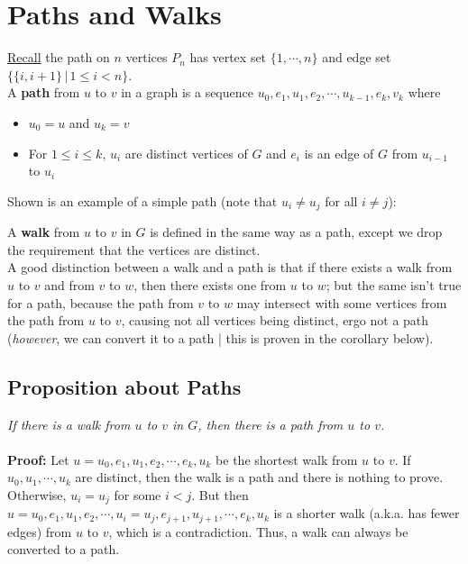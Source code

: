 \documentclass{report}
\begin{document}
\section{Paths and Walks}
\underline{Recall} the path on $n$ vertices $P_n$ has vertex set $\{1, \cdots, n\}$ and edge set $\{\{i, i+1\} \,\vert\, 1 \leq i < n\}$.\\
A \textbf{path} from $u$ to $v$ in a graph is a sequence $u_0, e_1, u_1, e_2, \cdots , u_{k-1}, e_k, v_k$ where
\begin{itemize}
\item $u_0 = u$ and $u_k = v$
\item For $1 \leq i \leq k$, $u_i$ are distinct vertices of $G$ and $e_i$ is an edge of $G$ from $u_{i-1}$ to $u_i$
\end{itemize}
Shown is an example of a simple path (note that $u_i \neq u_j$ for all $i \neq j$):
\begin{center}
\end{center}

\noindent A \textbf{walk} from $u$ to $v$ in $G$ is defined in the same way as a path, except we drop the requirement that the vertices are distinct.\\
A good distinction between a walk and a path is that if there exists a walk from $u$ to $v$ and from $v$ to $w$, then there exists one from $u$ to $w$; but the same isn't true for a path, because the path from $v$ to $w$ may intersect with some vertices from the path from $u$ to $v$, causing not all vertices being distinct, ergo not a path (\textit{however}, we can convert it to a path | this is proven in the corollary below).
\subsection{Proposition about Paths}
\textit{If there is a walk from $u$ to $v$ in $G$, then there is a path from $u$ to $v$.}
\\\\
\textbf{Proof:} Let $u = u_0, e_1, u_1, e_2, \cdots, e_k, u_k$ be the shortest walk from $u$ to $v$. If $u_0, u_1, \cdots, u_k$ are distinct, then the walk is a path and there is nothing to prove. Otherwise, $u_i = u_j$ for some $i < j$. But then $u = u_0, e_1, u_1, e_2, \cdots, u_i = u_j, e_{j+1}, u_{j+1}, \cdots, e_k, u_k$ is a shorter walk (a.k.a. has fewer edges) from $u$ to $v$, which is a contradiction. Thus, a walk can always be converted to a path.
\end{document}
